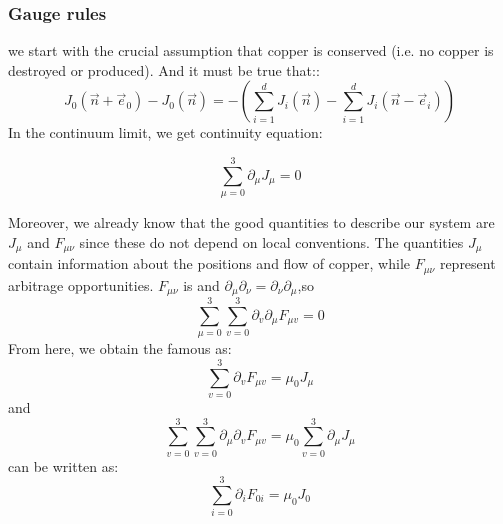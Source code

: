\subsubsection{Gauge rules}
we start with the crucial assumption that copper is conserved (i.e. no copper is destroyed or produced). And it must be true that::
\begin{equation}
J_{0}\left(\vec{n}+\vec{e}_{0}\right)-J_{0}(\vec{n})=-\left(\sum_{i=1}^{d} J_{i}(\vec{n})-\sum_{i=1}^{d} J_{i}\left(\vec{n}-\vec{e}_{i}\right)\right)
\end{equation}
In the continuum limit, we get continuity equation:
\begin{qt}
\begin{equation}
\sum_{\mu=0}^{3} \partial_{\mu} J_{\mu}=0
\end{equation}
\end{qt}
Moreover, we already know that the good quantities to describe our system are $J_{\mu}$ and $F_{\mu \nu}$ since these do not depend on local conventions. The quantities $J_{\mu}$ contain information about the positions and flow of copper, while $F_{\mu \nu}$ represent arbitrage opportunities. $F_{\mu\nu}$ is  and $\partial_{\mu} \partial_{\nu}=\partial_{\nu} \partial_{\mu}$,so 
\begin{equation}
\sum_{\mu=0}^{3} \sum_{v=0}^{3} \partial_{v} \partial_{\mu} F_{\mu v}=0
\end{equation}
From here, we obtain the famous  as:
\begin{equation}
    \sum_{v=0}^{3} \partial_{v} F_{\mu v}=\mu_{0} J_{\mu}
\end{equation}
and
\begin{equation}
\sum_{v=0}^{3} \sum_{v=0}^{3} \partial_{\mu} \partial_{v} F_{\mu v}=\mu_{0} \sum_{v=0}^{3} \partial_{\mu} J_{\mu}
\end{equation}
\textbf{} can be written as:
\begin{equation}
\sum_{i=0}^{3} \partial_{i} F_{0 i}=\mu_{0} J_{0}
\end{equation}


